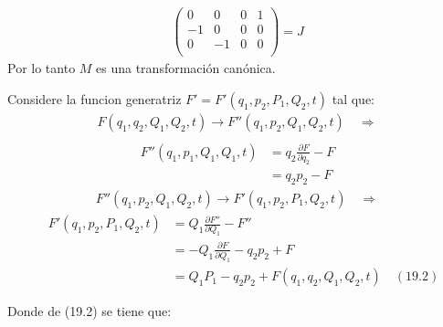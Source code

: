 \documentclass[a4paper]{article}
\begin{document}
\begin{answer}[Punto 19]
\begin{align*}
\begin{pmatrix}
                0 & 0 & 0 & 1\\
                -1 & 0 & 0 & 0\\
                0 & -1& 0 & 0\\
            \end{pmatrix} = J
        \end{align*}
        Por lo tanto $M$ es una transformación canónica.
        \item Considere la funcion generatriz $F' = F'(q_1, p_2, P_1, Q_2, t)$ tal que:
        \begin{align*}
            F(q_1, q_2, Q_1, Q_2, t)  \rightarrow F''(q_1, p_2, Q_1, Q_2, t) \quad \Rightarrow\\
        \end{align*} 
        \begin{align*}F''(q_1, p_1, Q_1, Q_1, t) &= q_2 \frac{\partial F}{\partial q_2}  - F\\
            &= q_2 p_2 - F
        \end{align*}
        \begin{align*}
            F''(q_1,p_2,Q_1,Q_2,t) \rightarrow F'(q_1, p_2, P_1, Q_2, t) \quad \Rightarrow 
        \end{align*}
        \begin{align*}
            \quad F'(q_1,p_2,P_1,Q_2,t) &= Q_1 \frac{\partial F''}{\partial Q_1}  - F''\\
            &= -Q_1 \frac{\partial F}{\partial Q_1}  - q_2 p_2 + F \\
            &= Q_1 P_1 - q_2 p_2 + F(q_1, q_2, Q_1, Q_2, t) \quad (19.2)
        \end{align*}

        Donde de (19.2) se tiene que:


\end{answer}
\end{document}
